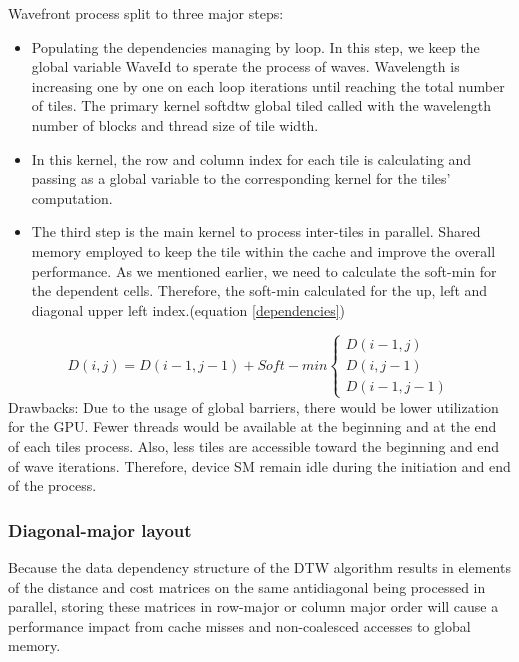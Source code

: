 \documentclass[12pt, letterpaper]{article}
\begin{document}
Wavefront process split to three major steps:

\begin{itemize}
  \item Populating the dependencies managing by loop. In this step, we keep the
    global variable WaveId to sperate the process of waves. Wavelength is
    increasing one by one on each loop iterations until reaching the total
    number of tiles. The primary kernel softdtw global tiled called with the
    wavelength number of blocks and thread size of tile width.
  \item In this kernel, the row and column index for each tile is calculating
    and passing as a global variable to the corresponding kernel for the tiles’
    computation.
  \item The third step is the main kernel to process inter-tiles in
    parallel. Shared memory employed to keep the tile within the cache and
    improve the overall performance. As we mentioned earlier, we need to
    calculate the soft-min for the dependent cells. Therefore, the soft-min
    calculated for the up, left and diagonal upper left index.(equation
    \ref{dependencies})
\end{itemize}

\begin{equation} \label{dependencies}
  D (i,j) = D(i-1, j-1) + Soft-min
  \begin{cases}
        D(i-1,j) \\
        D(i,j-1)\\
        D(i-1,j-1)
  \end{cases}
\end{equation}
Drawbacks: Due to the usage of global barriers, there would be lower utilization
for the GPU.  Fewer threads would be available at the beginning and at the end
of each tiles process.  Also, less tiles are accessible toward the beginning and
end of wave iterations.  Therefore, device SM remain idle during the initiation
and end of the process.

\subsubsection{Diagonal-major layout}

Because the data dependency structure of the DTW algorithm results in elements
of the distance and cost matrices on the same antidiagonal being processed in
parallel, storing these matrices in row-major or column major order will cause a
performance impact from cache misses and non-coalesced accesses to global
memory.
\end{document}
